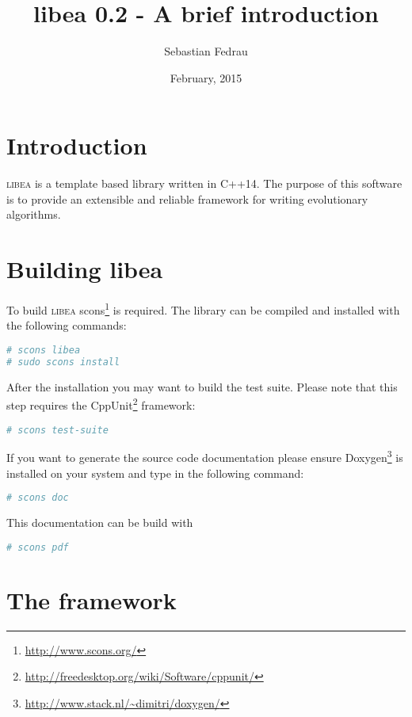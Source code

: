 \documentclass[a4paper]{article}
\title{libea 0.2 - A brief introduction}
\author{Sebastian Fedrau}
\date{February, 2015}
\begin{document}
\maketitle

\newpage

\section{Introduction}

\textsc{libea} is a template based library written in C++14. The purpose of this software is to provide an extensible and reliable framework for writing evolutionary algorithms.

\section{Building libea}

To build \textsc{libea} scons\footnote{\url{http://www.scons.org/}} is required. The library can be compiled and installed with the following commands:

\begin{lstlisting}[language=bash, numbers=none]
# scons libea
# sudo scons install
\end{lstlisting}

After the installation you may want to build the test suite. Please note that this step requires the CppUnit\footnote{\url{http://freedesktop.org/wiki/Software/cppunit/}} framework:

\begin{lstlisting}[language=bash, numbers=none]
# scons test-suite
\end{lstlisting}

If you want to generate the source code documentation please ensure Doxygen\footnote{\url{http://www.stack.nl/~dimitri/doxygen/}} is installed on your system and type in the following command:

\begin{lstlisting}[language=bash, numbers=none]
# scons doc
\end{lstlisting}

This documentation can be build with

\begin{lstlisting}[language=bash, numbers=none]
# scons pdf
\end{lstlisting}

\section{The framework}
\end{document}
